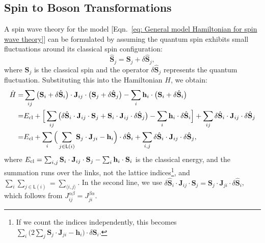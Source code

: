 \documentclass[aps, prx, nofootinbib, superscriptaddress]{revtex4-2}
\begin{document}
\subsection{Spin to Boson Transformations}\label{subsec: spin-to-boson transformation}
A spin wave theory for the model [Eqn.~\eqref{eq: General model Hamiltonian for spin wave theory}] can be formulated by assuming the quantum spin exhibits small fluctuations around its classical spin configuration:
\begin{equation}
    \hat{\mathbf{S}}_{j} = \mathbf{S}_{j} + \delta \hat{\mathbf{S}}_{j},
\end{equation}
where $\mathbf{S}_{j}$ is the classical spin and the operator $\delta \hat{\mathbf{S}}_{j}$ represents the quantum fluctuation. Substituting this into the Hamiltonian $H$, we obtain:
\begin{align*}
    \hat{H} 
    = & \sum_{ij} \big( \mathbf{S}_{i} + \delta \hat{\mathbf{S}}_{i} \big) \cdot \mathbf{J}_{ij} \cdot \big( \mathbf{S}_{j} + \delta \hat{\mathbf{S}}_{j} \big) - \sum_{i} \mathbf{h}_{i} \cdot \big( \mathbf{S}_{i} + \delta \hat{\mathbf{S}}_{i} \big) \\
    = & E_{\rm cl}
    + \Big[ \sum_{ij} \big( \delta \hat{\mathbf{S}}_{i} \cdot \mathbf{J}_{ij} \cdot \mathbf{S}_{j} + \mathbf{S}_{i} \cdot \mathbf{J}_{ij} \cdot \delta \hat{\mathbf{S}}_{j} \big) - \sum_{i} \mathbf{h}_{i} \cdot \delta \hat{\mathbf{S}}_{i} \Big] 
    + \sum_{ij} \delta \hat{\mathbf{S}}_{i} \cdot \mathbf{J}_{ij} \cdot \delta \hat{\mathbf{S}}_{j} \\
    = & E_{\rm cl}
    + \sum_{i} \Big( \sum_{j \in \mathsf{L}(i)} \mathbf{S}_{j} \cdot \mathbf{J}_{ji} - \mathbf{h}_{i} \Big) \cdot \delta \hat{\mathbf{S}}_{i}
    + \sum_{i,j} \delta \hat{\mathbf{S}}_{i} \cdot \mathbf{J}_{ij} \cdot \delta \hat{\mathbf{S}}_{j},
\end{align*}
where $E_{\rm cl} = \sum_{i,j} \mathbf{S}_{i} \cdot \mathbf{J}_{ij} \cdot \mathbf{S}_{j} - \sum_{i} \mathbf{h}_{i} \cdot \mathbf{S}_{i}$ is the classical energy, and the summation runs over the links, not the lattice indices\footnote{
    If we count the indices independently, this becomes $\sum_{i} \Big( 2 \sum_{j} \mathbf{S}_{j} \cdot \mathbf{J}_{ji} - \mathbf{h}_{i} \Big) \cdot \delta \hat{\mathbf{S}}_{i}$.
    },
and $\sum_{i} \sum_{j \in \mathsf{L}(i)} = \sum_{\langle i, j \rangle}$.
In the second line, we use $\delta \hat{\mathbf{S}}_{i} \cdot \mathbf{J}_{ij} \cdot \mathbf{S}_{j} = \mathbf{S}_{j} \cdot \mathbf{J}_{ji} \cdot \delta \hat{\mathbf{S}}_{i}$, which follows from $J_{ij}^{\alpha\beta} = J_{ji}^{\beta\alpha}$.
\end{document}
